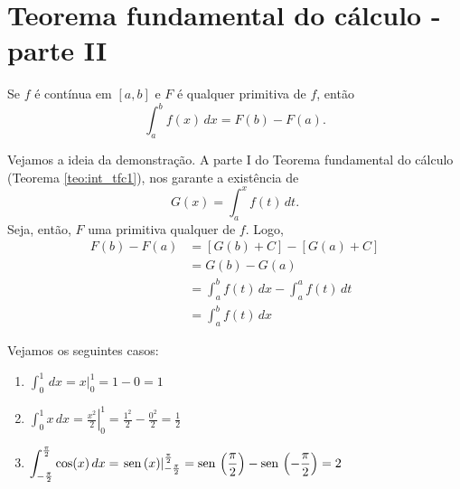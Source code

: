\cleardoublepage\documentclass[../main.tex]{subfiles}
\begin{document}
\section{Teorema fundamental do cálculo - parte II}
\begin{framed}\begin{teo}\label{teo:int_tfc2}
  Se $f$ é contínua em $[a, b]$ e $F$ é qualquer primitiva de $f$, então
  \begin{equation}
    \int_a^b f(x)\,dx = F(b) - F(a).
  \end{equation}
\end{teo}
\begin{framed}\begin{dem}
  Vejamos a ideia da demonstração. A parte I do Teorema fundamental do cálculo (Teorema \ref{teo:int_tfc1}), nos garante a existência de
  \begin{equation*}
    G(x) = \int_a^x f(t)\,dt.
  \end{equation*}
  Seja, então, $F$ uma primitiva qualquer de $f$. Logo,
  \begin{align*}
    F(b) - F(a) &= [G(b) + C] - [G(a) + C] \\
                &= G(b) - G(a) \\
                &= \int_a^b f(t)\,dx - \int_a^a f(t)\,dt \\
                &= \int_a^b f(t)\,dx
  \end{align*}
\end{dem}\end{framed}\end{framed}
\begin{ex}
  Vejamos os seguintes casos:
  \begin{enumerate}
  \item $\displaystyle \int_0^1 \,dx = \left. x \right|_0^1 = 1 - 0 = 1$
  \item $\displaystyle \int_0^1 x\,dx = \left.\frac{x^2}{2}\right|_0^1 = \frac{1^2}{2}-\frac{0^2}{2} = \frac{1}{2}$
  \item $\displaystyle \int_{-\frac{\pi}{2}}^{\frac{\pi}{2}} \cos(x)\,dx = \left.\operatorname{sen}\,(x)\right|_{-\frac{\pi}{2}}^{\frac{\pi}{2}} = \operatorname{sen}\,\left(\frac{\pi}{2}\right) - \operatorname{sen}\,\left(-\frac{\pi}{2}\right) = 2$
  \end{enumerate}
\end{ex}
\end{document}
